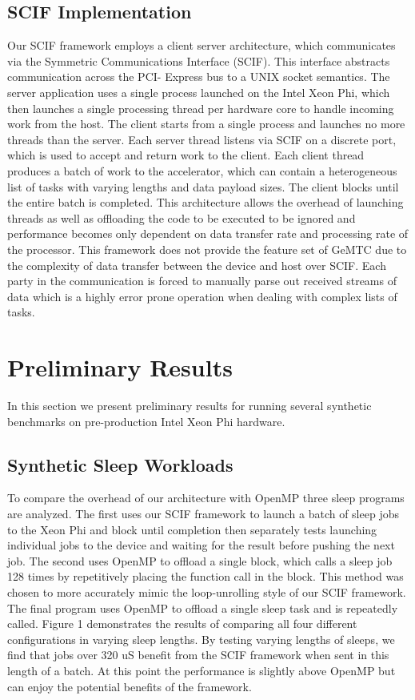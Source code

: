 \documentclass[conference]{IEEEtran}
\begin{document}
\subsection{SCIF Implementation}
Our SCIF framework employs a client server architecture, which communicates via the Symmetric Communications Interface (SCIF). This interface abstracts communication across the PCI- Express bus to a UNIX socket semantics. The server application uses a single process launched on the Intel Xeon Phi, which then launches a single processing thread per hardware core to handle incoming work from the host. The client starts from a single process and launches no more threads than the server. Each server thread listens via SCIF on a discrete port, which is used to accept and return work to the client. Each client thread produces a batch of work to the accelerator, which can contain a heterogeneous list of tasks with varying lengths and data payload sizes. The client blocks until the entire batch is completed. This architecture allows the overhead of launching threads as well as offloading the code to be executed to be ignored and performance becomes only dependent on data transfer rate and processing rate of the processor. This framework does not provide the feature set of GeMTC due to the complexity of data transfer between the device and host over SCIF. Each party in the communication is forced to manually parse out received streams of data which is a highly error prone operation when dealing with complex lists of tasks.

\section{Preliminary Results}
In this section we present preliminary results for running several synthetic benchmarks on pre-production Intel Xeon Phi hardware.

\subsection{Synthetic Sleep Workloads}
To compare the overhead of our architecture with OpenMP three sleep programs are analyzed. The first uses our SCIF framework to launch a batch of sleep jobs to the Xeon Phi and block until completion then separately tests launching individual jobs to the device and waiting for the result before pushing the next job. The second uses OpenMP to offload a single block, which calls a sleep job 128 times by repetitively placing the function call in the block. This method was chosen to more accurately mimic the loop-unrolling style of our SCIF framework. The final program uses OpenMP to offload a single sleep task and is repeatedly called. Figure 1 demonstrates the results of comparing all four different configurations in varying sleep lengths. By testing varying lengths of sleeps, we find that jobs over 320 uS benefit from the SCIF framework when sent in this length of a batch. At this point the performance is slightly above OpenMP but can enjoy the potential benefits of the framework.
\end{document}
